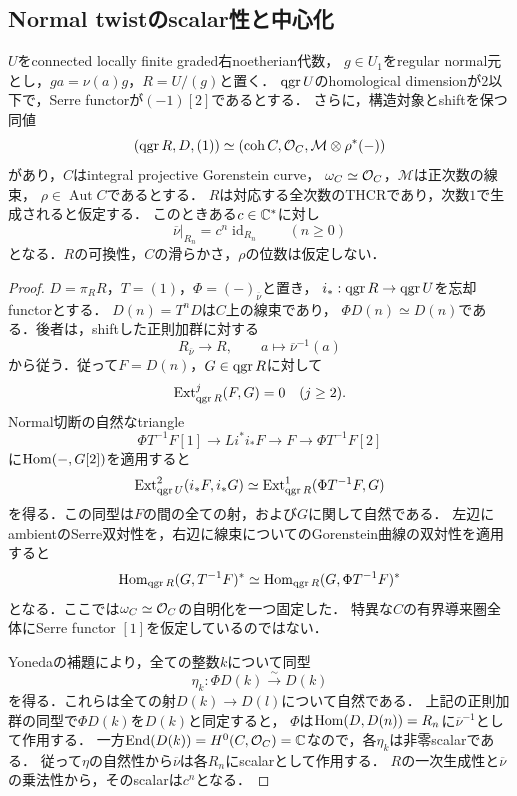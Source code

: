 \documentclass[11pt,a4paper]{ltjsarticle}
\begin{document}
\subsection{Normal twistのscalar性と中心化}

\begin{lemma}[幾何学的shiftを持つ境界上のnormal自己同型]
\label{lem:v8-thcr-normal-scalar}\label{lem:v7-normal-scalar-boundary}
$U$をconnected locally finite graded右noetherian代数，
$g\in U_1$をregular normal元とし，$ga=\nu(a)g$，$R=U/(g)$と置く．
$\operatorname{qgr} U$のhomological dimensionが$2$以下で，Serre functorが$(-1)[2]$であるとする．
さらに，構造対象とshiftを保つ同値
\[
 (\operatorname{qgr} R,D,(1))\simeq
 (\operatorname{coh} C,\mathcal O_C,\mathcal M\otimes\rho^*(-))
\]
があり，$C$はintegral projective Gorenstein curve，
$\omega_C\simeq\mathcal O_C$，$\mathcal M$は正次数の線束，
$\rho\in\operatorname{Aut}C$であるとする．
$R$は対応する全次数のTHCRであり，次数$1$で生成されると仮定する．
このときある$c\in\mathbb C^*$に対し
\[
 \overline\nu|_{R_n}=c^n\operatorname{id}_{R_n}\qquad(n\geq0)
\]
となる．$R$の可換性，$C$の滑らかさ，$\rho$の位数は仮定しない．
\end{lemma}

\begin{proof}
$D=\pi_RR$，$T=(1)$，$\Phi=(-)_{\overline\nu}$と置き，
$i_*:\operatorname{qgr} R\to\operatorname{qgr} U$を忘却functorとする．
$D(n)=T^nD$は$C$上の線束であり，
$\Phi D(n)\simeq D(n)$である．後者は，shiftした正則加群に対する
\[
 R_{\overline\nu}\longrightarrow R,\qquad a\longmapsto\overline\nu^{-1}(a)
\]
から従う．従って$F=D(n)$，$G\in\operatorname{qgr} R$に対して
\[
 \operatorname{Ext}^j_{\operatorname{qgr} R}(F,G)=0\quad(j\geq2).
\]
Normal切断の自然なtriangle
\[
 \Phi T^{-1}F[1]\longrightarrow Li^*i_*F
 \longrightarrow F\longrightarrow\Phi T^{-1}F[2]
\]
に$\operatorname{Hom}(-,G[2])$を適用すると
\[
 \operatorname{Ext}^2_{\operatorname{qgr} U}(i_*F,i_*G)
 \simeq \operatorname{Ext}^1_{\operatorname{qgr} R}(\Phi T^{-1}F,G)
\]
を得る．この同型は$F$の間の全ての射，および$G$に関して自然である．
左辺にambientのSerre双対性を，右辺に線束についてのGorenstein曲線の双対性を適用すると
\[
 \operatorname{Hom}_{\operatorname{qgr} R}(G,T^{-1}F)^*
 \simeq\operatorname{Hom}_{\operatorname{qgr} R}(G,\Phi T^{-1}F)^*
\]
となる．ここでは$\omega_C\simeq\mathcal O_C$の自明化を一つ固定した．
特異な$C$の有界導来圏全体にSerre functor $[1]$を仮定しているのではない．

Yonedaの補題により，全ての整数$k$について同型
\[
 \eta_k:\Phi D(k)\xrightarrow{\sim}D(k)
\]
を得る．これらは全ての射$D(k)\to D(l)$について自然である．
上記の正則加群の同型で$\Phi D(k)$を$D(k)$と同定すると，
$\Phi$は$\operatorname{Hom}(D,D(n))=R_n$に$\overline\nu^{-1}$として作用する．
一方$\operatorname{End}(D(k))=H^0(C,\mathcal O_C)=\mathbb C$なので，各$\eta_k$は非零scalarである．
従って$\eta$の自然性から$\overline\nu$は各$R_n$にscalarとして作用する．
$R$の一次生成性と$\overline\nu$の乗法性から，そのscalarは$c^n$となる．
\end{proof}
\end{document}
